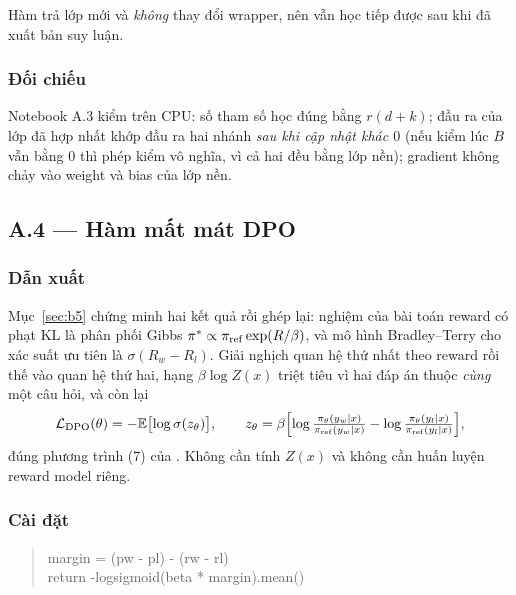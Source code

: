 Hàm trả lớp mới và \emph{không} thay đổi wrapper, nên vẫn học tiếp được sau khi đã
xuất bản suy luận.

\subsubsection{Đối chiếu \dalam}

Notebook A.3 kiểm trên CPU: số tham số học đúng bằng $r(d+k)$; đầu ra của lớp đã
hợp nhất khớp đầu ra hai nhánh \emph{sau khi cập nhật khác $0$} (nếu kiểm lúc
$B$ vẫn bằng $0$ thì phép kiểm vô nghĩa, vì cả hai đều bằng lớp nền); gradient
không chảy vào weight và bias của lớp nền.

\subsection{A.4 --- Hàm mất mát DPO}
\label{sec:a4}

\subsubsection{Dẫn xuất}

Mục~\ref{sec:b5} chứng minh hai kết quả rồi ghép lại: nghiệm của bài toán reward
có phạt KL là phân phối Gibbs
$\pi^*\propto\pi_{\mathrm{ref}}\exp(R/\beta)$, và mô hình Bradley--Terry cho xác suất ưu tiên
là $\sigma(R_w-R_l)$. Giải nghịch quan hệ thứ nhất theo reward rồi thế vào quan hệ
thứ hai, hạng $\beta\log Z(x)$ triệt tiêu vì hai đáp án thuộc \emph{cùng} một câu
hỏi, và còn lại
\begin{equation}
  \mathcal L_{\mathrm{DPO}}(\theta)
    =-\mathbb{E}\bigl[\log\sigma(z_\theta)\bigr],\qquad
  z_\theta=\beta\Bigl[
    \log\tfrac{\pi_\theta(y_w\mid x)}{\pi_{\mathrm{ref}}(y_w\mid x)}
    -\log\tfrac{\pi_\theta(y_l\mid x)}{\pi_{\mathrm{ref}}(y_l\mid x)}\Bigr],
  \label{eq:dpo-a4}
\end{equation}
đúng phương trình (7) của \cite{dpo}. Không cần tính $Z(x)$ và không cần huấn
luyện reward model riêng.

\subsubsection{Cài đặt}

\begin{quote}\small\ttfamily
margin = (pw - pl) - (rw - rl)\\
return -logsigmoid(beta * margin).mean()
\end{quote}

